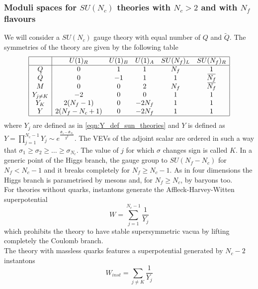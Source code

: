 \subsubsection{Moduli spaces for $SU(N_c)$ theories with $N_c >2 $ and with $N_f$ flavours }
\label{sec:modspace_sun_nf}
We will consider a $SU(N_c)$ gauge theory with equal number of $Q$ and $\tilde{Q}$.
The symmetries of the theory are given by the following table
 \begin{equation}
\begin{array}{| c | c c c c c |}
\hline
  & U(1)_R & U(1)_B & U(1)_A & SU(N_f)_L & SU(N_f)_R \\
 \hline
 Q & 0 &1 & 1 & N_f & 1 \\  
 \tilde{Q}& 0 &-1 & 1 &1 & \overbar{N_f}  \\  
   M & 0 & 0 & 2 & N_f & \overbar{N_f}\\  
   Y_{j \neq K} & -2 & 0  & 0 &  1 & 1 \\
   Y_{K} & 2 (N_f -1 ) & 0 & - 2 N_f & 1 & 1 \\
   Y & 2 ( N_f -N_c +1) & 0 & - 2 N_f & 1 & 1 \\
   \hline
\end{array}
\end{equation}
where $Y_j$ are defined as in \eqref{eqn:Y_def_sun_theories} and $Y$ is defined as $Y = \prod_{j=1}^{N_c -1} Y_j \sim e^{ \frac{ \Phi_1 - \Phi_{N_c}  }{g^2}}$.
The VEVs of the adjoint scalar are ordered in such a way that $ \sigma_1 \geq \sigma_2 \geq \dotsc \geq \sigma_{N_c}$. 
The value of $j$ for which $\sigma$ changes sign is called $K$.
In a generic point of the Higgs branch, the gauge group to $SU(N_f -N_c)$ for $N_f <N_c -1 $ and it breaks completely for $N_f \geq N_c - 1$. 
As in four dimensions the Higgs branch is parametrised by mesons and, for $N_f \geq N_c$, by baryons too.
\\
For theories without quarks, instantons generate the Affleck-Harvey-Witten \cite{Affleck:1982as} superpotential
\begin{equation}
W = \sum_{j=1}^{N_c - 1} \frac{1}{Y_j}
\label{eqn:def_AHW_Superpotential_Sun}
\end{equation}
which prohibits the theory to have stable supersymmetric vacua by lifting completely the Coulomb branch.\\
The theory with massless quarks features a superpotential generated by $N_c - 2$ instantons 
\begin{equation}
W_{inst} = \sum_{j \neq K} \frac{1}{Y_j}
\label{eqn:AHW_superpotential}
\end{equation}
